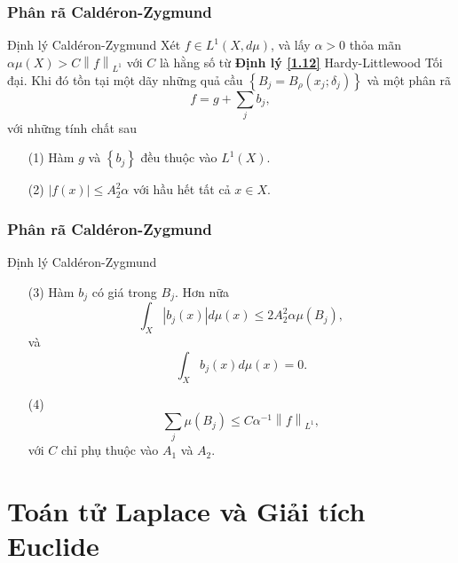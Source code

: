 \documentclass[11pt]{beamer}
\numberwithin{equation}{section}
\theoremstyle{plain}
\theoremstyle{definition}
\theoremstyle{remark}
\begin{document}
\begin{frame}\frametitle{Phân rã Caldéron-Zygmund}
\begin{block}{Định lý Caldéron-Zygmund}
Xét $f\in L^{1}\left(X,d\mu\right)$, và lấy $\alpha>0$ thỏa mãn $\alpha\mu\left(X\right)>C\left\|f\right\|_{L^1}$ với $C$ là hằng số từ \textbf{Định lý \eqref{1.12}} Hardy-Littlewood Tối đại. Khi đó tồn tại một dãy những quả cầu $\left\{ {{B_j} = {B_\rho }\left( {{x_j};{\delta _j}} \right)} \right\}$ và một phân rã 
\[f = g + \sum\limits_j {{b_j}}, \]
với những tính chất sau
\begin{itemize}
\item[(1)] Hàm $g$ và $\left\{b_{j}\right\}$ đều thuộc vào $L^{1}\left(X\right)$.
\item[(2)] $\left| {f\left( x \right)} \right| \le A_2^2\alpha$ với hầu hết tất cả $x\in X$.
\end{itemize}
\end{block}
\end{frame}
\begin{frame}\frametitle{Phân rã Caldéron-Zygmund}
\begin{block}{Định lý Caldéron-Zygmund}
\begin{itemize}
\item[(3)] Hàm $b_j$ có giá trong $B_j$. Hơn nữa 
\[\int_X {\left| {{b_j}\left( x \right)} \right|d\mu \left( x \right)}  \le 2A_2^2\alpha \mu \left( {{B_j}} \right),\] và
\[\int_X {{b_j}\left( x \right)d\mu \left( x \right)}  = 0.\]
\item[(4)] \[\sum\limits_j {\mu \left( {{B_j}} \right)}  \le C{\alpha ^{ - 1}}{\left\| f \right\|_{{L^1}}},\]
với $C$ chỉ phụ thuộc vào $A_{1}$ và $A_{2}$.
\end{itemize}
\end{block}
\end{frame}
\section{Toán tử Laplace và Giải tích Euclide}
\end{document}
